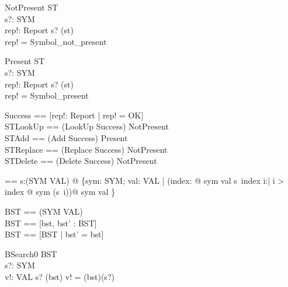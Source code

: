 \begin{schema}{NotPresent}
  \Xi ST \\
  s?: SYM \\
  rep!: Report
\where
  s? \notin \dom(st) \\
  rep! = Symbol\_not\_present
\end{schema}

\begin{schema}{Present}
  \Xi ST \\
  s?: SYM \\
  rep!: Report
\where
  s? \in \dom(st) \\
  rep! = Symbol\_present
\end{schema}

\begin{zed}
Success == [rep!: Report | rep! = OK] \\
STLookUp == (LookUp \land Success) \lor NotPresent \\
STAdd == (Add \land Success) \lor Present \\
STReplace == (Replace \land Success) \lor NotPresent \\
STDelete == (Delete \land Success) \lor NotPresent
\end{zed}


\begin{axdef}
  \distro == \lambda s:\seq (SYM \pfun VAL) @
      \{sym: SYM; val: VAL | (\exists index: \nat @ sym \mapsto val \in s~index \land \forall i:\nat | i > index @ sym \notin \dom(s~i))@ sym \mapsto val \}
\end{axdef}

\begin{zed}
  BST == \seq (SYM \pfun VAL) \\
  \Delta BST == [bst, bst' : BST] \\
  \Xi BST == [\Delta BST | bst' = bst] \\
\end{zed}

\begin{schema}{BSearch0}
  \Xi BST \\
  s?: SYM \\
  v!: VAL
\where
  s? \in \dom(\distro bst) \land v! = (\distro bst)(s?)
\end{schema}


